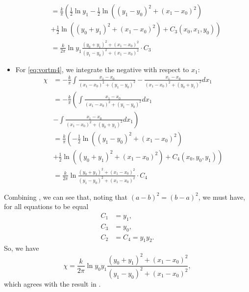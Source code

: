\documentclass[10pt, a4paper]{article}
\numberwithin{equation}{section}
\newcommand{\inv}[1]{\frac{1}{#1}}
\newcommand{\half}{\frac{1}{2}}
\begin{document}
\begin{itemize}
\begin{align}
&= \frac{k}{\pi}\left(\inv{2} \ln y_1 -\half \ln((y_1-y_0)^2 +(x_1-x_0)^2)\right. \nonumber\\ &\left. + \half \ln((y_0+y_1)^2 +(x_1-x_0)^2) +C_3 (x_0,x_1,y_0)\right)\nonumber\\
&=\frac{k}{2\pi}\ln y_1 \frac{(y_0+y_1)^2 +(x_1-x_0)^2}{(y_1-y_0)^2 +(x_1-x_0)^2} \cdot C_3\label{eq:chi3}
\end{align} 
\item For \cref{eq:vortm4}, we integrate the negative with respect to $x_1$:
\begin{align}
\chi &=-\frac{k}{\pi}\int \frac{x_1-x_0}{(x_1-x_0)^2 + (y_1-y_0)^2} - \frac{x_1-x_0}{(x_1-x_0)^2 +(y_0+y_1)^2} dx_1\nonumber\\
&= -\frac{k}{\pi} \left( \int  \frac{x_1-x_0}{(x_1-x_0)^2 + (y_1-y_0)^2} dx_1\right. \nonumber\\ &\left.- \int \frac{x_1-x_0}{(x_1-x_0)^2 +(y_0+y_1)^2} dx_1 \right)\nonumber\\
&= \frac{k}{\pi}\left(-\half \ln((y_1-y_0)^2 +(x_1-x_0)^2)\right. \nonumber\\ &\left. + \half \ln((y_0+y_1)^2 +(x_1-x_0)^2) +C_4 (x_0,y_0,y_1)\right)\nonumber\\
&=\frac{k}{2\pi}\ln \frac{(y_0+y_1)^2 +(x_1-x_0)^2}{(y_1-y_0)^2 +(x_1-x_0)^2} \cdot C_4\label{eq:chi4}
\end{align}
\end{itemize}
Combining , we can see that, noting that $(a-b)^2 = (b-a)^2$, we must have, for all equations to be equal
\begin{align}
C_1&=y_1,\\
C_3&=y_0,\\
C_2&=C_4=y_1 y_2.
\end{align}
So, we have
\begin{equation}
\chi=\frac{k}{2\pi}\ln y_0 y_1 \frac{(y_0+y_1)^2 +(x_1-x_0)^2}{(y_1-y_0)^2 +(x_1-x_0)^2},
\label{eq:chifinal}
\end{equation}
which agrees with the result in \citet{love94}.
\end{document}
